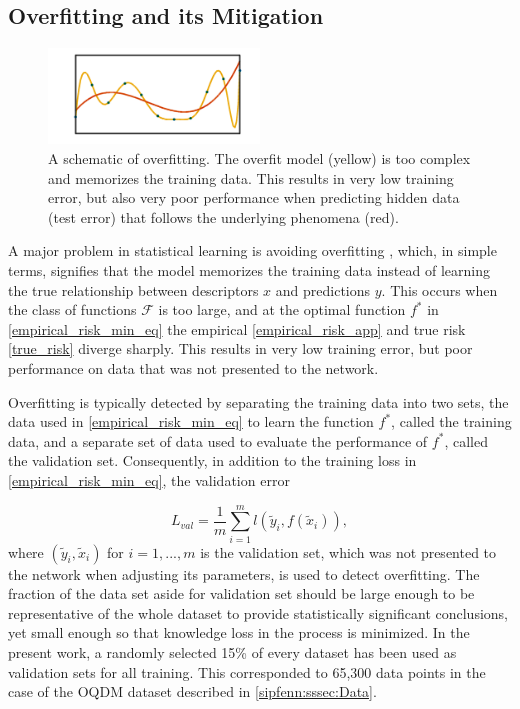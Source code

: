 \subsection{Overfitting and its Mitigation}
\label{sipfenn:ssec:overfitting}

\begin{figure}[h]
    \centering
    \includegraphics[width=0.5\textwidth]{sipfenn/overfitting.png}
    \caption{A schematic of overfitting. The overfit model (yellow) is too complex and memorizes the training data. This results in very low training error, but also very poor performance when predicting hidden data (test error) that follows the underlying phenomena (red).}
    \label{sipfenn:fig:overfitting}
\end{figure}

A major problem in statistical learning is avoiding overfitting \cite{hastie2009elements}, which, in simple terms, signifies that the model memorizes the training data instead of learning the true  relationship between descriptors $x$ and predictions $y$. This occurs when the class of functions $\mathcal{F}$ is too large, and at the optimal function $f^*$ in \eqref{empirical_risk_min_eq} the empirical \eqref{empirical_risk_app} and true risk \eqref{true_risk} diverge sharply. This results in very low training error, but poor performance on data that was not presented to the network.

Overfitting is typically detected by separating the training data into two sets, the data used in \eqref{empirical_risk_min_eq} to learn the function $f^*$, called the training data, and a separate set of data used to evaluate the performance of $f^*$, called the validation set. Consequently, in addition to the training loss in \eqref{empirical_risk_min_eq}, the validation error

\begin{equation}\label{sipfenn:validation_loss}
    L_{val} = \frac{1}{m}\displaystyle\sum_{i=1}^m l(\tilde{y}_i, f(\tilde{x}_i)),
\end{equation}
where $(\tilde{y}_i,\tilde{x}_i)$ for $i=1,...,m$ is the validation set, which was not presented to the network when adjusting its parameters, is used to detect overfitting. 
The fraction of the data set aside for validation set should be large enough to be representative of the whole dataset to provide statistically significant conclusions, yet small enough so that knowledge loss in the process is minimized. In the present work, a randomly selected 15\% of every dataset has been used as validation sets for all training. This corresponded to 65,300 data points in the case of the OQDM dataset described in \ref{sipfenn:sssec:Data}.


